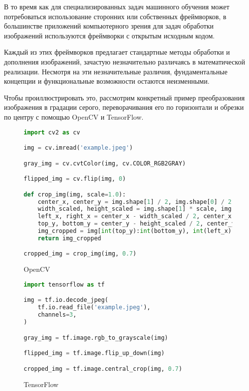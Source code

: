 В то время как для специализированных задач машинного обучения может потребоваться использование сторонних или собственных фреймворков, в большинстве приложений компьютерного зрения для задач обработки изображений используются фреймворки с открытым исходным кодом.

Каждый из этих фреймворков предлагает стандартные методы обработки и дополнения изображений, зачастую незначительно различаясь в математической реализации. Несмотря на эти незначительные различия, фундаментальные концепции и функциональные возможности остаются неизменными.

Чтобы проиллюстрировать это, рассмотрим конкретный пример преобразования изображения в градации серого, переворачивания его по горизонтали и обрезки по центру с помощью OpenCV и TensorFlow.

\begin{figure}
\begin{lstlisting}[language=Python]
import cv2 as cv

img = cv.imread('example.jpeg')

gray_img = cv.cvtColor(img, cv.COLOR_RGB2GRAY)

flipped_img = cv.flip(img, 0)

def crop_img(img, scale=1.0):
    center_x, center_y = img.shape[1] / 2, img.shape[0] / 2
    width_scaled, height_scaled = img.shape[1] * scale, img.shape[0] * scale
    left_x, right_x = center_x - width_scaled / 2, center_x + width_scaled / 2
    top_y, bottom_y = center_y - height_scaled / 2, center_y + height_scaled / 2
    img_cropped = img[int(top_y):int(bottom_y), int(left_x):int(right_x)]
    return img_cropped

cropped_img = crop_img(img, 0.7)
\end{lstlisting}
\caption{OpenCV}
\label{src:src1}
\end{figure} 


\begin{figure}
\begin{lstlisting}[language=Python]
import tensorflow as tf

img = tf.io.decode_jpeg(
    tf.io.read_file('example.jpeg'),
    channels=3,
)

gray_img = tf.image.rgb_to_grayscale(img)

flipped_img = tf.image.flip_up_down(img)

cropped_img = tf.image.central_crop(img, 0.7)
\end{lstlisting}
\caption{TensorFlow}
\label{src:src2}
\end{figure}

